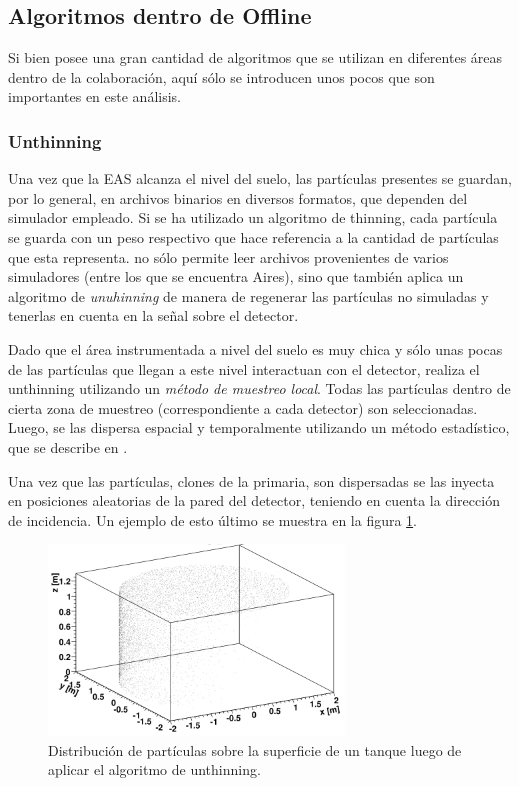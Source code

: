 	\subsection{Algoritmos dentro de Offline}
	
	Si bien \Offline{} posee una gran cantidad de algoritmos que se utilizan en diferentes \'areas dentro de la colaboraci\'on, aqu\'i s\'olo se introducen unos pocos que son importantes en este an\'alisis.
	
		\subsubsection{Unthinning}
		
		Una vez que la EAS alcanza el nivel del suelo, las part\'iculas presentes se guardan, por lo general, en archivos binarios en diversos formatos, que dependen del simulador empleado.
		Si se ha utilizado un algoritmo de thinning, cada part\'icula se guarda con un peso respectivo que hace referencia a la cantidad de part\'iculas que esta representa.
		\Offline{} no s\'olo permite leer archivos provenientes de varios simuladores (entre los que se encuentra {\sc Aires}), sino que tambi\'en aplica un algoritmo de \textit{unuhinning} de manera de regenerar las part\'iculas no simuladas y tenerlas en cuenta en la se\~nal sobre el detector.
		
		Dado que el \'area instrumentada a nivel del suelo es muy chica y s\'olo unas pocas de las part\'iculas que llegan a este nivel interactuan con el detector,
		\Offline{} realiza el unthinning utilizando un \textit{m\'etodo de muestreo local}.
		Todas las part\'iculas dentro de cierta zona de muestreo (correspondiente a cada detector) son seleccionadas.
		Luego, se las dispersa espacial y temporalmente utilizando un m\'etodo estad\'istico, que se describe en \cite{unthinning1}.
		
		Una vez que las part\'iculas, clones de la primaria, son dispersadas se las inyecta en posiciones aleatorias de la pared del detector, teniendo en cuenta la direcci\'on de incidencia. 
		Un ejemplo de esto \'ultimo se muestra en la figura \ref{fig:unthinning_tank}.
		\begin{figure}[h!]
			\begin{center}
			\includegraphics[width=0.7\textwidth]{fig/simulacionAuger/unthinning_tank}
			\caption{Distribuci\'on de part\'iculas sobre la superficie de un tanque luego de aplicar el algoritmo de unthinning.}
			\label{fig:unthinning_tank}
			\end{center}
		\end{figure}
		
